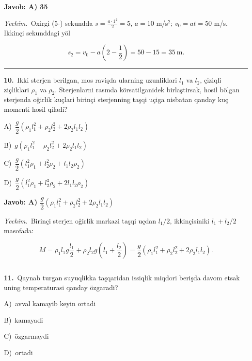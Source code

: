\documentclass[11pt,a4paper]{article}
\newcommand{\opt}[2]{\hspace*{4mm}#1)\ #2\par}
\begin{document}
\noindent\colorbox{gray!12}{\parbox{\dimexpr\linewidth-2\fboxsep}{\textbf{Javob: A) 35}}}\par\smallskip
\noindent\textit{Yechim.}\ Oxirgi (5-) sekundda $s=\frac{a\cdot1^2}{2}=5$, $a=10$ m/s$^2$; $v_0=at=50$ m/s. Ikkinçi sekunddagi yöl\par
\[s_2=v_0-a\left(2-\frac12\right)=50-15=35\ \text{m}.\]\par\medskip\hrule\medskip
{}\noindent\begin{minipage}{\linewidth}
\textbf{10.}\ Ikki sterjen berilgan, mos ravişda ularning uzunliklari $l_1$ va $l_2$, çiziqli ziçliklari $\rho_1$ va $\rho_2$. Sterjenlarni rasmda körsatilganidek birlaştirsak, hosil bölgan sterjenda oğirlik kuçlari birinçi sterjenning taşqi uçiga nisbatan qanday kuç momenti hosil qiladi?\par\smallskip
\noindent\hspace*{4mm}\par\smallskip
\opt{A}{$\dfrac{g}{2}(\rho_1l_1^2+\rho_2l_2^2+2\rho_2l_1l_2)$}
\opt{B}{$g(\rho_1l_1^2+\rho_2l_2^2+2\rho_2l_1l_2)$}
\opt{C}{$\dfrac{g}{2}(l_1^2\rho_1+l_2^2\rho_2+l_1l_2\rho_2)$}
\opt{D}{$\dfrac{g}{2}(l_1^2\rho_1+l_2^3\rho_2+2l_1l_2\rho_2)$}
\end{minipage}\vspace{2pt}\par
\noindent\colorbox{gray!12}{\parbox{\dimexpr\linewidth-2\fboxsep}{\textbf{Javob: A) $\dfrac{g}{2}(\rho_1l_1^2+\rho_2l_2^2+2\rho_2l_1l_2)$}}}\par\smallskip
\noindent\textit{Yechim.}\ Birinçi sterjen oğirlik markazi taşqi uçdan $l_1/2$, ikkinçisiniki $l_1+l_2/2$ masofada:\par
\[M=\rho_1l_1g\frac{l_1}{2}+\rho_2l_2g\left(l_1+\frac{l_2}{2}\right)=\frac{g}{2}\left(\rho_1l_1^2+\rho_2l_2^2+2\rho_2l_1l_2\right).\]\par\medskip\hrule\medskip
{}\noindent\begin{minipage}{\linewidth}
\textbf{11.}\ Qaynab turgan suyuqlikka taşqaridan issiqlik miqdori berişda davom etsak uning temperaturasi qanday özgaradi?\par\smallskip
\opt{A}{avval kamayib keyin ortadi}
\opt{B}{kamayadi}
\opt{C}{özgarmaydi}
\opt{D}{ortadi}
\end{minipage}\vspace{2pt}\par
\end{document}
